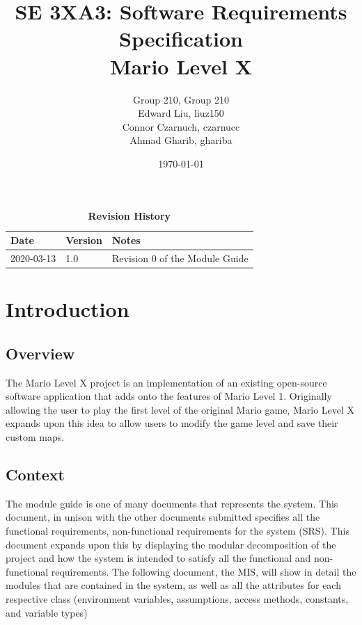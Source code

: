 \documentclass[12pt, titlepage]{article}
\title{SE 3XA3: Software Requirements Specification\\Mario Level X}
\author{Group 210, Group 210
		\\ Edward Liu, liuz150
		\\ Connor Czarnuch, czarnucc
		\\ Ahmad Gharib, ghariba
}
\date{\today}
\begin{document}
\maketitle

\tableofcontents
\listoftables
\listoffigures

\begin{table}[bp]
\caption{\bf Revision History}
\begin{tabularx}{\textwidth}{p{3cm}p{2cm}X}
\toprule {\bf Date} & {\bf Version} & {\bf Notes}\\
\midrule
2020-03-13 & 1.0 & Revision 0 of the Module Guide\\
\bottomrule
\end{tabularx}
\end{table}

\newpage


\section{Introduction}

\subsection{Overview}
The Mario Level X project is an implementation of an existing open-source software application that adds onto the features of Mario Level 1. Originally allowing the user to play the first level of the original Mario game, Mario Level X expands upon this idea to allow users to modify the game level and save their custom maps.

\subsection{Context}
The module guide is one of many documents that represents the system. This document, in unison with the other documents submitted specifies all the functional requirements, non-functional requirements for the system (SRS). This document expands upon this by displaying the modular decomposition of the project and how the system is intended to satisfy all the functional and non-functional requirements. The following document, the MIS, will show in detail the modules that are contained in the system, as well as all the attributes for each respective class (environment variables, assumptions, access methods, constants, and variable types)
\end{document}

